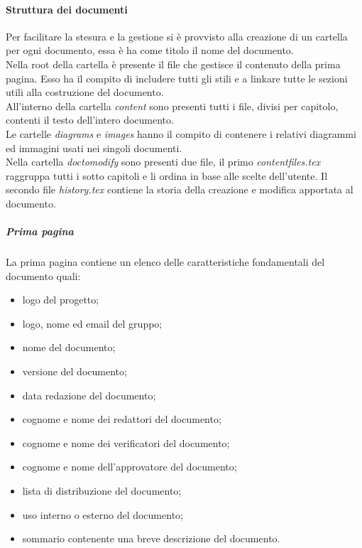 			\paragraph{Struttura dei documenti}
			Per facilitare la stesura e la gestione si è provvisto alla creazione di un cartella per ogni documento, essa è ha come titolo il nome del documento.\\
			Nella root della cartella è presente il file che gestisce il contenuto della prima pagina. Esso ha il compito di includere tutti gli stili e a linkare tutte le sezioni utili alla costruzione del documento.\\
			All'interno della cartella \emph{content} sono presenti tutti i file, divisi per capitolo, contenti il testo dell'intero documento.\\
			Le cartelle \emph{diagrams} e \emph{images} hanno il compito di contenere i relativi diagrammi ed immagini usati nei singoli documenti.\\
			Nella cartella \emph{doc\textunderscore to\textunderscore modify} sono presenti due file, il primo \emph{content\textunderscore files.tex} raggruppa tutti i sotto capitoli e li ordina in base alle scelte dell'utente. Il secondo file \emph{history.tex} contiene la storia della creazione e modifica apportata al documento.

				\subparagraph{Prima pagina}
				La prima pagina contiene un elenco delle caratteristiche fondamentali del documento quali:
				\begin{itemize}
					\item logo del progetto;
					\item logo, nome ed email del gruppo; 
					\item nome del documento;
					\item versione del documento;
					\item data redazione del documento;
					\item cognome e nome dei redattori del documento;
					\item cognome e nome dei verificatori del documento;
					\item cognome e nome dell'approvatore del documento;
					\item lista di distribuzione del documento;
					\item uso interno o esterno del documento;
					\item sommario contenente una breve descrizione del documento.
				\end{itemize}

